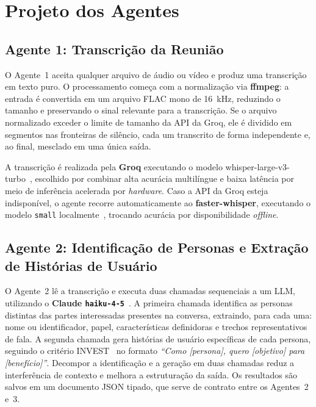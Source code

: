 \section{Projeto dos Agentes}
\label{sec:agentes}

\subsection{Agente 1: Transcrição da Reunião}

O Agente~1 aceita qualquer arquivo de áudio ou vídeo e produz uma transcrição em texto puro. O processamento começa com a normalização via \textbf{ffmpeg}: a entrada é convertida em um arquivo FLAC mono de 16~kHz, reduzindo o tamanho e preservando o sinal relevante para a transcrição. Se o arquivo normalizado exceder o limite de tamanho da API da Groq, ele é dividido em segmentos nas fronteiras de silêncio, cada um transcrito de forma independente e, ao final, mesclado em uma única saída.

A transcrição é realizada pela \textbf{Groq} executando o modelo {\ttfamily whisper-large-v3-turbo}~\cite{whisper2022,groq2025}, escolhido por combinar alta acurácia multilíngue e baixa latência por meio de inferência acelerada por \textit{hardware}. Caso a API da Groq esteja indisponível, o agente recorre automaticamente ao \textbf{faster-whisper}, executando o modelo \texttt{small} localmente~\cite{ctranslate2}, trocando acurácia por disponibilidade \textit{offline}.

\subsection{Agente 2: Identificação de Personas e Extração de Histórias de Usuário}

O Agente~2 lê a transcrição e executa duas chamadas sequenciais a um LLM, utilizando o \textbf{Claude \texttt{haiku-4-5}}~\cite{anthropic2025claude}. A primeira chamada identifica as personas distintas das partes interessadas presentes na conversa, extraindo, para cada uma: nome ou identificador, papel, características definidoras e trechos representativos de fala. A segunda chamada gera histórias de usuário específicas de cada persona, seguindo o critério INVEST~\cite{wake2003invest} no formato \textit{``Como [persona], quero [objetivo] para [benefício]''}. Decompor a identificação e a geração em duas chamadas reduz a interferência de contexto e melhora a estruturação da saída. Os resultados são salvos em um documento JSON tipado, que serve de contrato entre os Agentes~2 e~3.

